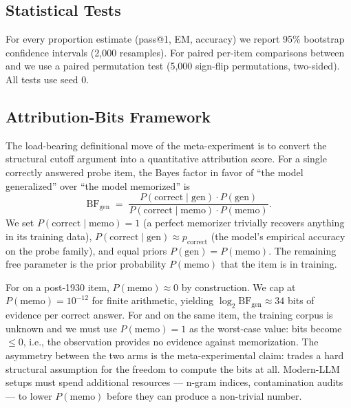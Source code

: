 \subsection{Statistical Tests}
\label{sec:method:stats}

For every proportion estimate (pass@1, EM, accuracy) we report 95\% bootstrap confidence intervals (2{,}000 resamples). For paired per-item \bpt comparisons between \talkienineteen and \talkieweb we use a paired permutation test (5{,}000 sign-flip permutations, two-sided). All tests use seed 0.

\subsection{Attribution-Bits Framework}
\label{sec:method:bits}

The load-bearing definitional move of the meta-experiment is to convert the structural cutoff argument into a quantitative attribution score. For a single correctly answered probe item, the Bayes factor in favor of ``the model generalized'' over ``the model memorized'' is
\begin{equation}
\mathrm{BF}_{\text{gen}} \;=\; \frac{P(\text{correct} \mid \text{gen}) \cdot P(\text{gen})}{P(\text{correct} \mid \text{memo}) \cdot P(\text{memo})}.
\label{eq:bf}
\end{equation}
We set $P(\text{correct} \mid \text{memo}) = 1$ (a perfect memorizer trivially recovers anything in its training data), $P(\text{correct} \mid \text{gen}) \approx p_{\text{correct}}$ (the model's empirical accuracy on the probe family), and equal priors $P(\text{gen}) = P(\text{memo})$. The remaining free parameter is the prior probability $P(\text{memo})$ that the item is in training.

For \talkienineteen on a post-1930 item, $P(\text{memo}) \approx 0$ by construction. We cap at $P(\text{memo}) = 10^{-12}$ for finite arithmetic, yielding $\log_2 \mathrm{BF}_{\text{gen}} \approx 34$ bits of evidence per correct answer. For \talkieweb and \gptfour on the same item, the training corpus is unknown and we must use $P(\text{memo}) = 1$ as the worst-case value: bits become $\le 0$, i.e., the observation provides no evidence against memorization. The asymmetry between the two arms is the meta-experimental claim: \talkienineteen trades a hard structural assumption for the freedom to compute the bits at all. Modern-LLM setups must spend additional resources --- n-gram indices, contamination audits --- to lower $P(\text{memo})$ before they can produce a non-trivial number.

